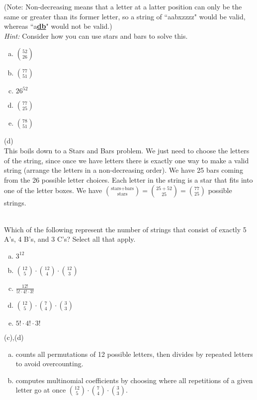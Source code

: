 (Note: Non-decreasing means that a letter at a latter position can only be the same or greater than its former letter, so a string of ``aabxzzzz" would be valid, whereas ``a\textbf{\underline{db}}" would not be valid.)\\
\textit{Hint:} Consider how you can use stars and bars to solve this.
\begin{enumerate}[(a)]
	\item  $\binom{52}{26}$

	\item  $\binom{77}{51}$

	\item  $26^{52}$

	\item  $\binom{77}{25}$

	\item  $\binom{78}{51}$

\end{enumerate}
\begin{solution}

(d)\\
This boils down to a Stars and Bars problem. We just need to choose the letters of the string, since once we have letters there is exactly one way to make a valid string (arrange the letters in a non-decreasing order). We have 25 bars coming from the 26 possible letter choices. Each letter in the string is a star that fits into one of the letter boxes. We have $\binom{\text{stars+bars}}{\text{stars}}=\binom{25+52}{25}=\binom{77}{25}$ possible strings.

\end{solution}
\\
Which of the following represent the number of strings that consist of exactly 5 A's, 4 B's, and 3 C's?  Select all that apply.
\begin{enumerate}[(a)]
	\item  $3^{12}$

	\item  $\binom{12}{5}\cdot\binom{12}{4}\cdot\binom{12}{3}$

	\item  $\frac{12!}{5!\cdot4!\cdot3!}$

	\item  $\binom{12}{5}\cdot\binom{7}{4}\cdot\binom{3}{3}$

	\item  $5!\cdot 4!\cdot 3!$

\end{enumerate}
\begin{solution}

(c),(d)
\begin{enumerate}[(a)]
\addtocounter{enumi}{2}
\item counts all permutations of 12 possible letters, then divides by repeated letters to avoid overcounting. 
\item computes multinomial coefficients by choosing where all repetitions of a given letter go at once $\binom{12}{5}\cdot \binom{7}{4}\cdot\binom{3}{3}$.
\end{enumerate}

\end{solution}


